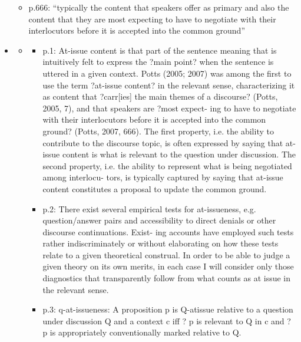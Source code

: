 \documentclass[11pt,fleqn]{article}
\newcommand{\6}{\mbox{$[\hspace*{-.6mm}[$}}
\newcommand{\9}{\mbox{$]\hspace*{-.6mm}]$}}
\begin{document}
\begin{itemize}
\begin{itemize}

\item p.666: ``typically the content that speakers offer as primary and also the content that they are most expecting to have to negotiate with their interlocutors before it is accepted into the common ground''

\end{itemize}

\item \citealt{koev2013,koev2018,koev2021}

\begin{itemize}

\item \citealt{koev2018} 

\begin{itemize}

\item p.1: At-issue content is that part of the sentence meaning that is intuitively felt to express the ?main point? when the sentence is uttered in a given context. Potts (2005; 2007) was among the first to use the term ?at-issue content? in the relevant sense, characterizing it as content that ?carr[ies] the main themes of a discourse? (Potts, 2005, 7), and that speakers are ?most expect- ing to have to negotiate with their interlocutors before it is accepted into the common ground? (Potts, 2007, 666).  The first property, i.e. the ability to contribute to the discourse topic, is often expressed by saying that at-issue content is what is relevant to the question under discussion. The second property, i.e. the ability to represent what is being negotiated among interlocu- tors, is typically captured by saying that at-issue content constitutes a proposal to update the common ground.

\item p.2: There exist several empirical tests for at-issueness, e.g. question/answer pairs and accessibility to direct denials or other discourse continuations. Exist- ing accounts have employed such tests rather indiscriminately or without elaborating on how these tests relate to a given theoretical construal. In order to be able to judge a given theory on its own merits, in each case I will consider only those diagnostics that transparently follow from what counts as at issue in the relevant sense.

\item p.3: q-at-issueness:  A proposition p is Q-atissue relative to a question under discussion Q and a context c iff ? p is relevant to Q in c and
? p is appropriately conventionally marked relative to Q.


\end{itemize}
\end{itemize}
\end{itemize}
\end{document}

